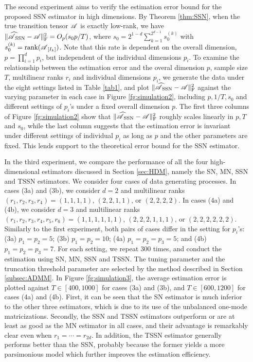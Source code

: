 \documentclass[12pt]{article}
\newcommand{\cm}[1]{\mbox{\boldmath$\mathscr{#1}$}}
\begin{document}
The second experiment aims to verify the estimation error bound for the proposed SSN estimator in  high dimensions. By Theorem \ref{thm:SSN},
when the true transition tensor $\cm{A}$ is exactly low-rank, we have $\|\cm{\widehat{A}}_{\text{SSN}}-\cm{A}\|_{\text{F}}^2=O_p(s_0p/T)$, where $s_0=2^{1-d}\sum_{k=1}^{2^{d-1}}s_0^{(k)}$ with $s_0^{(k)}=\text{rank}(\cm{A}_{[I_k]})$. Note that this  rate is dependent on the overall dimension, $p=\prod_{i=1}^{d}p_i$, but independent of the individual dimensions $p_i$. To examine the relationship between the estimation error and the overal dimension $p$, sample size $T$, multilinear ranks $r_i$ and individual dimensions $p_i$, we generate the data under the eight settings listed in Table \ref{tab1}, and  plot $\|\cm{\widehat{A}}_{\text{SSN}}-\cm{A}\|_{\text{F}}^2$ against the varying parameter in each case in Figure \ref{fg:simulation2}, including $p, 1/T, s_0$ and different settings of $p_i$'s under a fixed overall dimension $p$. The first three columns of  Figure \ref{fg:simulation2} show that  $\|\cm{\widehat{A}}_{\text{SSN}}-\cm{A}\|_{\text{F}}^2$ roughly scales linearly in $p, T$ and $s_0$, while the last column suggests that the estimation error is invariant under different settings of individual $p_i$ as long as $p$ and the other parameters are fixed.  This lends support to the theoretical error bound for the SSN estimator.



In the third experiment, we compare the performance of all the four high-dimensional estimators discussed in Section \ref{sec:HDM}, namely the SN, MN, SSN and TSSN estimators.  We consider four cases of data generating processes. In cases (3a) and (3b), we consider $d=2$ and multilinear ranks $(r_1,r_2,r_3,r_4)=(1,1,1,1)$, $(2,2,1,1)$, or $(2,2,2,2)$. In cases (4a) and (4b), we consider $d=3$ and multilinear ranks $(r_1,r_2,r_3,r_4,r_5,r_6)=(1,1,1,1,1,1)$, $(2,2,2,1,1,1)$, or $(2,2,2,2,2,2)$. Similarly to the first experiment, both pairs of cases differ in the setting for $p_i$'s: (3a) $p_1=p_2=5$; (3b) $p_1=p_2=10$; (4a) $p_1=p_2=p_3=5$; and (4b) $p_1=p_2=p_3=7$. For each setting, we repeat 300 times, and conduct the estimation using SN, MN, SSN and TSSN. The tuning parameter and the truncation threshold parameter are selected by the method described in Section \ref{subsec:ADMM}. In  Figure \ref{fg:simulation3}, the average estimation error is plotted against $T\in[400,1000]$ for cases (3a) and (3b), and $T\in[600,1200]$ for cases (4a) and (4b). First, it can be seen that the SN estimator is much inferior to the other three estimators, which is due to its use of the unbalanced one-mode matricizations. Secondly, the SSN and TSSN estimators outperform or are at least as good as the MN estimator in all cases, and their advantage is remarkably clear even when $r_1=\cdots=r_{2d}$.   In addition, the TSSN estimator generally performs better than the SSN, probably because the former yields a more parsimonious model which further improves the estimation efficiency. 
\end{document}
